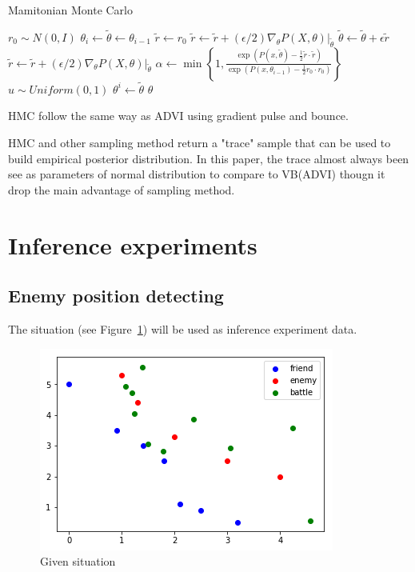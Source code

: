 \documentclass{article}
\begin{document}
\begin{algorithm}
\caption{Mamitonian Monte Carlo}
\begin{algorithmic}[1]
 
        \State $r_0 \sim N(0,I)$
        \State $\theta_i \gets \tilde{\theta} \gets \theta_{i-1}$
        \State $\tilde{r} \gets r_0$
         
            \State $\tilde{r} \gets \tilde{r} + (\epsilon/2) \nabla_\theta P(X,\theta)|_{\tilde{\theta}}$
            \State $\tilde{\theta} \gets \tilde{\theta} + \epsilon \tilde{r}$
            \State $\tilde{r} \gets \tilde{r} + (\epsilon/2) \nabla_\theta P(X,\theta)|_{\tilde{\theta}}$
        \EndFor
        \State $\alpha \gets \min \left\{ 1, \frac{\exp(P(x,\tilde{\theta})-\frac{1}{2}\tilde{r}\cdot\tilde{r})}{\exp(P(x,\theta_{i-1})-\frac{1}{2}r_0\cdot r_0)} \right\}$
        \State $u \sim Uniform(0,1)$
            \State $\theta^i \gets \tilde{\theta}$
        \EndIf
    \EndFor
    \State \Return $\theta$
\EndProcedure
\end{algorithmic}
\label{alg:hmc}
\end{algorithm}

HMC follow the same way as ADVI using gradient pulse and bounce.

HMC and other sampling method return a "trace" sample that can be used 
to build empirical posterior distribution. In this paper, the trace almost always been see as
parameters of normal distribution to compare to VB(ADVI) thougn it drop the main advantage of sampling method.

\section{Inference experiments}

\subsection{Enemy position detecting}

The situation (see Figure~\ref{fig:expState}) will be used as inference experiment data.

\begin{figure}[h]
\includegraphics[width=0.6\linewidth]{exp_state.png}
\caption{Given situation}
\label{fig:expState}
\end{figure}
\end{document}
